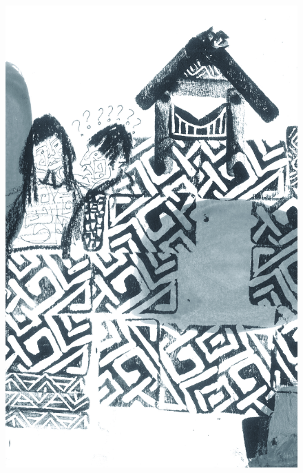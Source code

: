\pagebreak
\thispagestyle{empty}
\begin{figure}
\vspace*{-1.6cm}
\hspace*{-2.2cm}\includegraphics[width=138mm]{./imgs/img9.jpg}
\end{figure}

\chapter*{}

\mbox{}\vspace*{\fill}


